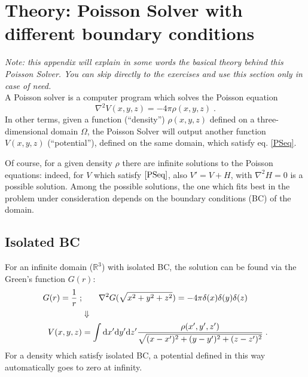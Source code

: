 \documentclass[a4paper]{article}
\newcommand{\dd}{{\rm d}}
\newcommand{\be}{\begin{equation}}
\newcommand{\ee}{\end{equation}}
\begin{document}
\section*{Theory: Poisson Solver with different boundary conditions}
\textit{Note: this appendix will explain in some words the basical theory behind this Poisson Solver. You can skip directly to the exercises and use this section only in case of need.}\\
A Poisson solver is a computer program which solves the Poisson equation
\be\label{PSeq}
\nabla^2 V(x,y,z) = - 4 \pi \rho(x,y,z)\;.
\ee
In other terms, given a function (``density'') $\rho(x,y,z)$ defined on a three-dimensional domain $\Omega$, the Poisson Solver will output another function $V(x,y,z)$ (``potential''), defined on the same domain, which satisfy eq. \eqref{PSeq}.

Of course, for a given density $\rho$ there are infinite solutions to the Poisson equations: indeed, for $V$ which satisfy $\eqref{PSeq}$, also $V'=V+H$, with $\nabla^2 H=0$ is a possible solution. Among the possible solutions, the one which fits best in the problem under consideration depends on the boundary conditions (BC) of the domain.

\subsection*{Isolated BC}
For an infinite domain ($\mathbb R^3$) with isolated BC, the solution can be found via the Green's function $G(r)$:
\begin{align} 
G(r)=\frac{1}{r}\;;&\qquad\nabla^2 G(\sqrt{x^2+y^2+z^2}) = -4 \pi \delta(x) \delta(y) \delta(z) \label{isolatedGF} \\
&\Downarrow \notag \\
V(x,y,z)&=\int \dd x' \dd y' \dd z'\frac{\rho(x',y',z')}{\sqrt{(x-x')^2+(y-y')^2+(z-z')^2}}\;.\label{solutionIBC}
\end{align}
For a density which satisfy isolated BC, a potential defined in this way automatically goes to zero at infinity.
\end{document}
